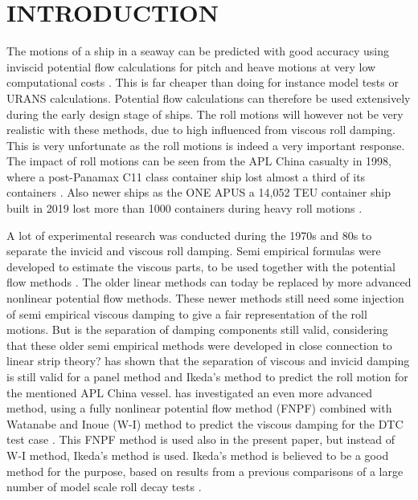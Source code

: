 \section*{INTRODUCTION}\label{introduction}

The motions of a ship in a seaway can be predicted with good accuracy
using inviscid potential flow calculations for pitch and heave motions
at very low computational costs \citep{7505983/FB64RGPF}. This is far
cheaper than doing for instance model tests or URANS calculations.
Potential flow calculations can therefore be used extensively during the
early design stage of ships. The roll motions will however not be very
realistic with these methods, due to high influenced from viscous roll
damping. This is very unfortunate as the roll motions is indeed a very
important response. The impact of roll motions can be seen from the APL
China casualty in 1998, where a post-Panamax C11 class container ship
lost almost a third of its containers \citep{7505983/WPADAQB3}. Also
newer ships as the ONE APUS a 14,052 TEU container ship built in 2019
lost more than 1000 containers during heavy roll motions
\citep{7505983/EYV6YF92}.

A lot of experimental research was conducted during the 1970s and 80s to
separate the invicid and viscous roll damping. Semi empirical formulas
were developed to estimate the viscous parts, to be used together with
the potential flow methods \citep{7505983/937PN5DT}. The older linear
methods can today be replaced by more advanced nonlinear potential flow
methods. These newer methods still need some injection of semi empirical
viscous damping to give a fair representation of the roll motions. But
is the separation of damping components still valid, considering that
these older semi empirical methods were developed in close connection to
linear strip theory? \citep{7505983/UGK6YEVD} has shown that the
separation of viscous and invicid damping is still valid for a panel
method and Ikeda's method to predict the roll motion for the mentioned
APL China vessel. \citep{7505983/24TNAV5Z} has investigated an even more
advanced method, using a fully nonlinear potential flow method (FNPF)
\citep{7505983/P4XDUMMQ} combined with Watanabe and Inoue (W-I) method
\citep{7505983/ARMIRMVY} to predict the viscous damping for the DTC test
case \citep{7505983/BYNJ8CFG}. This FNPF method is used also in the
present paper, but instead of W-I method, Ikeda's method is used.
Ikeda's method is believed to be a good method for the purpose, based on
results from a previous comparisons of a large number of model scale
roll decay tests \citep{7505983/QMGQ76Q9}.

